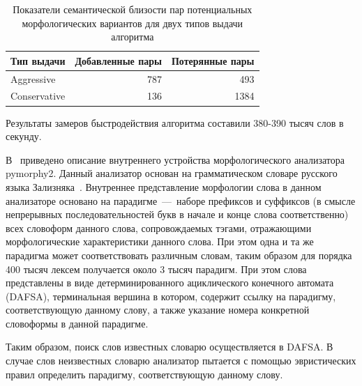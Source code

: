  \begin{table}[H]
 	\centering
 	\caption{Показатели семантической близости пар потенциальных морфологических вариантов для двух типов выдачи алгоритма}
 	\begin{tabular}{|c|c|c|}
 		\hline 
 		Тип выдачи & Добавленные пары & Потерянные пары \\
 		\hline
 		\multicolumn{1}{|l}{Aggressive} & \multicolumn{1}{|r}{787} & \multicolumn{1}{|r|}{493} \\\hline
 		\multicolumn{1}{|l}{Conservative} & \multicolumn{1}{|r}{136} & \multicolumn{1}{|r|}{1384} \\\hline
 	\end{tabular}
 	\label{tab:stemka_ppmv}
 \end{table}

Результаты замеров быстродействия алгоритма составили 380-390 тысяч слов в секунду.

\begin{sloppypar}
В~\cite{Pymorphy2Internals} приведено описание внутреннего устройства морфологического анализатора \mbox{pymorphy2}. Данный анализатор основан на грамматическом словаре русского языка Зализняка~\cite{Zalizniak1980}. Внутреннее представление морфологии слова в данном анализаторе основано на парадигме~---~наборе префиксов и суффиксов (в смысле непрерывных последовательностей букв в начале и конце слова соответственно) всех словоформ данного слова, сопровождаемых тэгами, отражающими морфологические характеристики данного слова. При этом одна и та же парадигма может соответствовать различным словам, таким образом для порядка 400 тысяч лексем получается около 3 тысяч парадигм. При этом слова представлены в виде детерминированного ациклического конечного автомата (DAFSA), терминальная вершина в котором, содержит ссылку на парадигму, соответствующую данному слову, а также указание номера конкретной словоформы в данной парадигме.\end{sloppypar}

Таким образом, поиск слов известных словарю осуществляется в DAFSA. В случае слов неизвестных словарю анализатор пытается с помощью эвристических правил определить парадигму, соответствующую данному слову. 

